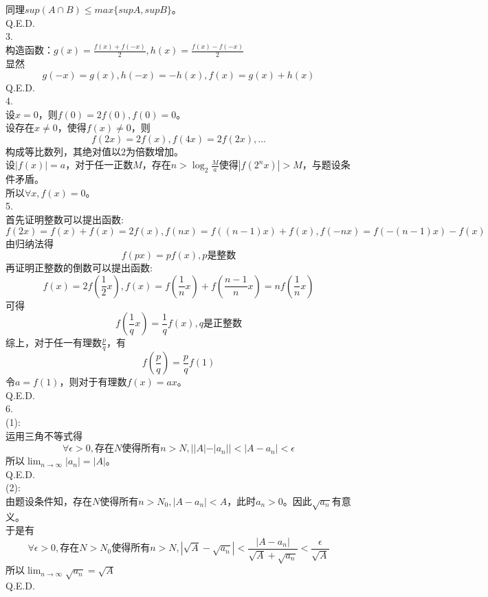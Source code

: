 \documentclass[utf8]{ctexart}
\begin{document}
同理$sup(A\cap B)\le max\{sup A,sup B\}$。\\
Q.E.D.\\
3.\\
构造函数：$g(x)=\frac{f(x)+f(-x)}{2},h(x)=\frac{f(x)-f(-x)}{2}$\\
显然$$g(-x)=g(x),h(-x)=-h(x),f(x)=g(x)+h(x)$$
Q.E.D.\\
4.\\
设$x=0$，则$f(0)=2f(0),f(0)=0$。\\
设存在$x\neq 0$，使得$f(x)\neq 0$，则
$$f(2x)=2f(x),f(4x)=2f(2x),...$$
构成等比数列，其绝对值以$2$为倍数增加。\\
设$|f(x)|=a$，对于任一正数$M$，存在$n>\log_2\frac{M}{a}$使得$|f(2^nx)|>M$，与题设条件矛盾。\\
所以$\forall x,f(x)=0$。\\
5.\\
首先证明整数可以提出函数:
$$f(2x)=f(x)+f(x)=2f(x),f(nx)=f((n-1)x)+f(x),f(-nx)=f(-(n-1)x)-f(x)$$
由归纳法得$$f(px)=pf(x),p\text{是整数}$$
再证明正整数的倒数可以提出函数:
$$f(x)=2f(\frac{1}{2}x),f(x)=f(\frac{1}{n}x)+f(\frac{n-1}{n}x)=nf(\frac{1}{n}x)$$
可得$$f(\frac{1}{q}x)=\frac{1}{q}f(x),q\text{是正整数}$$
综上，对于任一有理数$\frac{p}{q}$，有
$$f(\frac{p}{q})=\frac{p}{q}f(1)$$
令$a=f(1)$，则对于有理数$f(x)=ax$。\\
Q.E.D.\\
6.\\
(1):\\
运用三角不等式得
$$\forall \epsilon>0,\text{存在}N\text{使得所有}n>N,||A|-|a_n||<|A-a_n|<\epsilon$$
所以$\lim_{n\to \infty}|a_n|=|A|$。\\
Q.E.D.\\
(2):\\
由题设条件知，$\text{存在}N\text{使得所有}n>N_0,|A-a_n|<A$，此时$a_n>0$。因此$\sqrt{a_n}$有意义。\\
于是有
$$\forall \epsilon>0,\text{存在}N>N_0\text{使得所有}n>N,|\sqrt{A}-\sqrt{a_n}|<\frac{|A-a_n|}{\sqrt{A}+\sqrt{a_n}}<\frac{\epsilon}{\sqrt{A}}$$
所以$\lim_{n\to \infty}\sqrt{a_n}=\sqrt{A}$\\
Q.E.D.
\end{document}
